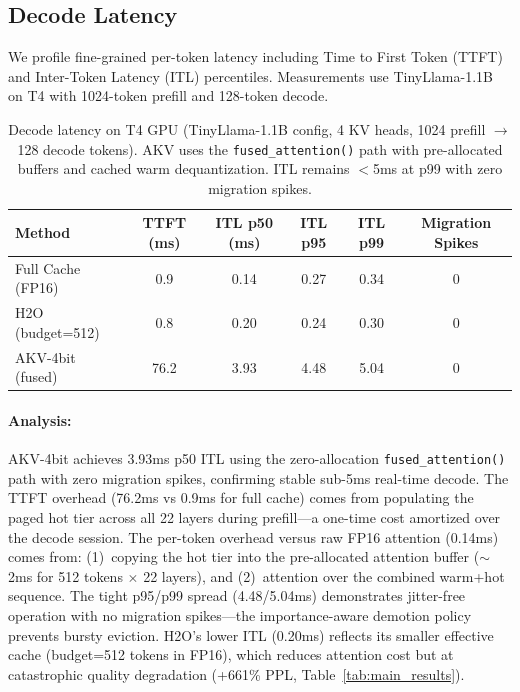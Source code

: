 \documentclass[11pt,a4paper]{article}
\begin{document}
\subsection{Decode Latency}

We profile fine-grained per-token latency including Time to First Token (TTFT) and Inter-Token Latency (ITL) percentiles. Measurements use TinyLlama-1.1B on T4 with 1024-token prefill and 128-token decode.

\begin{table}[h]
\centering
\begin{tabular}{lccccc}
\toprule
\textbf{Method} & \textbf{TTFT (ms)} & \textbf{ITL p50 (ms)} & \textbf{ITL p95} & \textbf{ITL p99} & \textbf{Migration Spikes} \\
\midrule
Full Cache (FP16) & 0.9 & 0.14 & 0.27 & 0.34 & 0 \\
H2O (budget=512) & 0.8 & 0.20 & 0.24 & 0.30 & 0 \\
AKV-4bit (fused) & 76.2 & 3.93 & 4.48 & 5.04 & 0 \\
\bottomrule
\end{tabular}
\caption{Decode latency on T4 GPU (TinyLlama-1.1B config, 4 KV heads, 1024 prefill $\to$ 128 decode tokens). AKV uses the \texttt{fused\_attention()} path with pre-allocated buffers and cached warm dequantization. ITL remains $<$5ms at p99 with zero migration spikes.}
\label{tab:latency}
\end{table}

\paragraph{Analysis:} AKV-4bit achieves 3.93ms p50 ITL using the zero-allocation \texttt{fused\_attention()} path with zero migration spikes, confirming stable sub-5ms real-time decode. The TTFT overhead (76.2ms vs 0.9ms for full cache) comes from populating the paged hot tier across all 22 layers during prefill---a one-time cost amortized over the decode session. The per-token overhead versus raw FP16 attention (0.14ms) comes from: (1)~copying the hot tier into the pre-allocated attention buffer ($\sim$2ms for 512 tokens $\times$ 22 layers), and (2)~attention over the combined warm+hot sequence. The tight p95/p99 spread (4.48/5.04ms) demonstrates jitter-free operation with no migration spikes---the importance-aware demotion policy prevents bursty eviction. H2O's lower ITL (0.20ms) reflects its smaller effective cache (budget=512 tokens in FP16), which reduces attention cost but at catastrophic quality degradation (+661\% PPL, Table~\ref{tab:main_results}).
\end{document}
